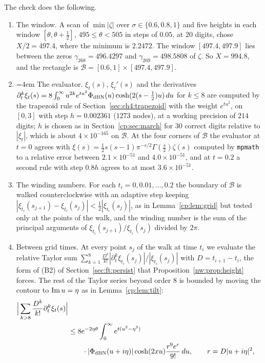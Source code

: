 The check does the following.
\begin{enumerate}
\item The window. A scan of $\min|\zeta|$ over $\sigma\in\{0.6,0.8,1\}$ and five heights in each window $[\theta,\theta+\frac12]$, $495\le\theta<505$ in steps of $0.05$, at $20$ digits, chose $X/2=497.4$, where the minimum is $2.2472$. The window $[497.4,497.9]$ lies between the zeros $\gamma_{268}=496.4297$ and $\gamma_{269}=498.5808$ of $\zeta$. So $X=994.8$, and the rectangle is $\mathcal B=[0.6,1]\times[497.4,497.9]$.
\item {\emergencystretch=4em The evaluator. $\xi_t(s)$, $\xi_t'(s)$ and the derivatives $\partial_t^k\xi_t(s)=8\int_0^\infty u^{2k}e^{tu^2}\allowbreak\Phi_{\rm dBN}(u)\allowbreak\cosh(2(s-\frac12)u)\,du$ for $k\le8$ are computed by the trapezoid rule of Section~\ref{sec:ch4:trapezoid} with the weight $e^{tu^2}$, on $[0,3]$ with step $h=0.002361$ ($1273$ nodes), at a working precision of $214$ digits; $h$ is chosen as in Section~\ref{cp:sec:march} for $30$ correct digits relative to $|\xi_t|$, which is about $4\times10^{-165}$ on $\mathcal B$. At the four corners of $\mathcal B$ the evaluator at $t=0$ agrees with $\xi(s)=\frac12s(s-1)\pi^{-s/2}\Gamma(\frac s2)\zeta(s)$ computed by \texttt{mpmath} \cite{mpmath} to a relative error between $2.1\times10^{-51}$ and $4.0\times10^{-51}$, and at $t=0.2$ a second rule with step $0.8h$ agrees to at most $3.6\times10^{-51}$.\par}
\item The winding numbers. For each $t_i=0,0.01,\dots,0.2$ the boundary of $\mathcal B$ is walked counterclockwise with an adaptive step keeping $|\xi_{t_i}(s_{j+1})-\xi_{t_i}(s_j)|<\frac12|\xi_{t_i}(s_j)|$, as in Lemma~\ref{cp:lem:grid} but tested only at the points of the walk, and the winding number is the sum of the principal arguments of $\xi_{t_i}(s_{j+1})/\xi_{t_i}(s_j)$ divided by $2\pi$.
\item Between grid times. At every point $s_j$ of the walk at time $t_i$ we evaluate the relative Taylor sum $\sum_{k=1}^8\frac{D^k}{k!}|\partial_t^k\xi_{t_i}(s_j)|/|\xi_{t_i}(s_j)|$ with $D=t_{i+1}-t_i$, the form of (B2) of Section~\ref{sec:ft:persist} that Proposition~\ref{nw:prop:height} forces. The rest of the Taylor series beyond order $8$ is bounded by moving the contour to $\operatorname{Im} u=\eta$ as in Lemma~\ref{cp:lem:tilt}:
\[
\begin{aligned}\Big|\sum_{k>8}\frac{D^k}{k!}\partial_t^k\xi_t(s)\Big|\\{}&\le8e^{-2\eta\theta}\int_0^\infty e^{t(u^2-\eta^2)}\\{}&\qquad{}\cdot|\Phi_{\rm dBN}(u+i\eta)|\cosh(2xu)\frac{r^9e^r}{9!}\,du,\qquad r=D|u+i\eta|^2,\end{aligned}
\]
\end{enumerate}
